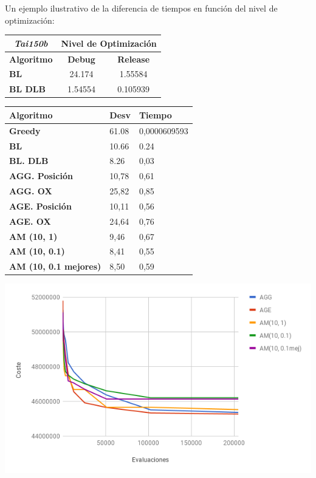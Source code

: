 \documentclass[a4paper, 12pt]{article}
\begin{document}
      Un ejemplo ilustrativo de la diferencia de tiempos en función del nivel de optimización:
      
\begin{table}[H]
\centering
\label{my-label}
\begin{tabular}{l|c|c|}
\cline{2-3}
\multicolumn{1}{c|}{{\textit{Tai150b}}} & \multicolumn{2}{c|}{\textbf{Nivel de Optimización}} \\ \hline
\multicolumn{1}{|c|}{\textbf{Algoritmo}}    & \textbf{Debug}          & \textbf{Release}          \\ \hline
\multicolumn{1}{|l|}{\textbf{BL}}           & 24.174                  & 1.55584                   \\ \hline
\multicolumn{1}{|l|}{\textbf{BL DLB}}       & 1.54554                 & 0.105939                  \\ \hline
\end{tabular}
\end{table}

	\newpage
	\begin{table}[H]
\centering
\label{my-label}
\begin{tabular}{|l|l|l|}
\hline
\textbf{Algoritmo}            & \textbf{Desv} & \textbf{Tiempo} \\ \hline
\textbf{Greedy}               & 61.08         & 0,0000609593    \\ \hline
\textbf{BL}                   & 10.66         & 0.24            \\ \hline
\textbf{BL. DLB}              & 8.26          & 0,03            \\ \hline
\textbf{AGG. Posición}        & 10,78         & 0,61            \\ \hline
\textbf{AGG. OX}              & 25,82         & 0,85            \\ \hline
\textbf{AGE. Posición}        & 10,11         & 0,56            \\ \hline
\textbf{AGE. OX}              & 24,64         & 0,76            \\ \hline
\textbf{AM (10, 1)}           & 9,46          & 0,67            \\ \hline
\textbf{AM (10, 0.1)}         & 8,41          & 0,55            \\ \hline
\textbf{AM (10, 0.1 mejores)} & 8,50          & 0,59            \\ \hline
\end{tabular}
\end{table}

	\begin{center}
         \includegraphics[scale=0.7]{evals-vs-coste}
      \end{center}
      
      
      
   
\printindex
\end{document}
